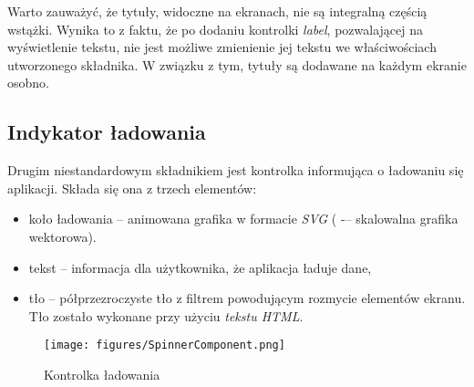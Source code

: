 \vspace{1cm}

Warto zauważyć, że tytuły, widoczne na ekranach, nie są integralną częścią wstążki. Wynika to z faktu, że po dodaniu kontrolki \emph{label}, pozwalającej na wyświetlenie tekstu, nie jest możliwe zmienienie jej tekstu we właściwościach utworzonego składnika. W związku z tym, tytuły są dodawane na każdym ekranie osobno.

\newpage

\subsection{Indykator ładowania}
Drugim niestandardowym składnikiem jest kontrolka informująca o ładowaniu się aplikacji. Składa się ona z trzech elementów:
\begin{itemize}
    \item koło ładowania -- animowana grafika w formacie \emph{SVG} ( -– skalowalna grafika wektorowa).
    \item tekst -- informacja dla użytkownika, że aplikacja ładuje dane,
    \item tło -- półprzezroczyste tło z filtrem powodującym rozmycie elementów ekranu. Tło zostało wykonane przy użyciu \emph{tekstu HTML}.
\end{itemize}

\begin{figure}[H]
    \centering
    \texttt{[image: figures/SpinnerComponent.png]}
    \caption{Kontrolka ładowania}
    \label{fig:spinnercomponent}
\end{figure}


